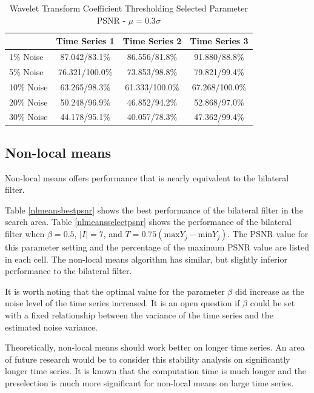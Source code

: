 \documentclass[11pt]{article}
\theoremstyle{definition}
\begin{document}
\begin{table}[!h]
\small
\begin{center}
\begin{tabular}{lccc}
\hline
 & Time Series 1 & Time Series 2 & Time Series 3 \\ \hline
1\% Noise & 87.042/83.1\% & 86.556/81.8\% & 91.880/88.8\% \\ \hline
5\% Noise & 76.321/100.0\% & 73.853/98.8\% & 79.821/99.4\% \\ \hline
10\% Noise & 63.265/98.3\% & 61.333/100.0\% & 67.268/100.0\% \\ \hline
20\% Noise & 50.248/96.9\% & 46.852/94.2\% & 52.868/97.0\% \\ \hline
30\% Noise & 44.178/95.1\% & 40.057/78.3\% & 47.362/99.4\% \\ \hline
\end{tabular}
\caption{Wavelet Transform Coefficient Thresholding Selected Parameter PSNR - $\mu = 0.3 \sigma$}
\label{waveletselectpsnr}
\end{center}
\end{table}

\subsection{Non-local means} 
Non-local means offers performance that is nearly equivalent to the
bilateral filter.

Table \ref{nlmeansbestpsnr} shows the best performance of the
bilateral filter in the search area. Table \ref{nlmeansselectpsnr}
shows the performance of the bilateral filter when $\beta = 0.5$,
$\lvert I \rvert = 7$, and $T = 0.75 \left( \mathrm{max} Y_j -
  \mathrm{min} Y_j \right)$. The PSNR value for this parameter setting
and the percentage of the maximum PSNR value are listed in each cell.
The non-local means algorithm has similar, but slightly inferior
performance to the bilateral filter.

It is worth noting that the optimal value for the parameter $\beta$
did increase as the noise level of the time series increased. It is an
open question if $\beta$ could be set with a fixed relationship
between the variance of the time series and the estimated noise
variance.

Theoretically, non-local means should work better on longer time
series. An area of future research would be to consider this stability
analysis on significantly longer time series. It is known that the
computation time is much longer and the preselection is much more
significant for non-local means on large time series.
\end{document}
